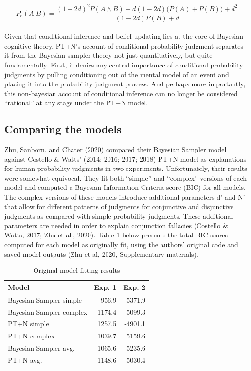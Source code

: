\documentclass{article}
\begin{document}
\[ P_e(A|B) = \frac{(1-2d)^2P(A \land B) + d(1-2d)\big(P(A)+P(B)\big)+d^2}{(1-2d)P(B)+d} \]\\
Given that conditional inference and belief updating lies at the core of
Bayesian cognitive theory, PT+N's account of conditional probability
judgment separates it from the Bayesian sampler theory not just
quantitatively, but quite fundamentally. First, it denies any central
importance of conditional probability judgments by pulling conditioning
out of the mental model of an event and placing it into the probability
judgment process. And perhaps more importantly, this non-bayesian
account of conditional inference can no longer be considered
``rational'' at any stage under the PT+N model.

\hypertarget{comparing-the-models}{%
\subsection{Comparing the models}\label{comparing-the-models}}

Zhu, Sanborn, and Chater (2020) compared their Bayesian Sampler model
against Costello \& Watts' (2014; 2016; 2017; 2018) PT+N model as
explanations for human probability judgments in two experiments.
Unfortunately, their results were somewhat equivocal. They fit both
``simple'' and ``complex'' versions of each model and computed a
Bayesian Information Criteria score (BIC) for all models. The complex
versions of these models introduce additional parameters d' and N' that
allow for different patterns of judgments for conjunctive and
disjunctive judgments as compared with simple probability judgments.
These additional parameters are needed in order to explain conjunction
fallacies (Costello \& Watts, 2017; Zhu et al., 2020). Table 1 below
presents the total BIC scores computed for each model as originally fit,
using the authors' original code and saved model outputs (Zhu et al,
2020, Supplementary materials).

\begin{table}

\caption{\label{tab:table1}Original model fitting results}
\centering
\begin{tabular}[t]{lrr}
\toprule
Model & Exp. 1 & Exp. 2\\
\midrule
Bayesian Sampler simple & 956.9 & -5371.9\\
Bayesian Sampler complex & 1174.4 & -5099.3\\
PT+N simple & 1257.5 & -4901.1\\
PT+N complex & 1039.7 & -5159.6\\
Bayesian Sampler avg. & 1065.6 & -5235.6\\
\addlinespace
PT+N avg. & 1148.6 & -5030.4\\
\bottomrule
\end{tabular}
\end{table}
\end{document}

